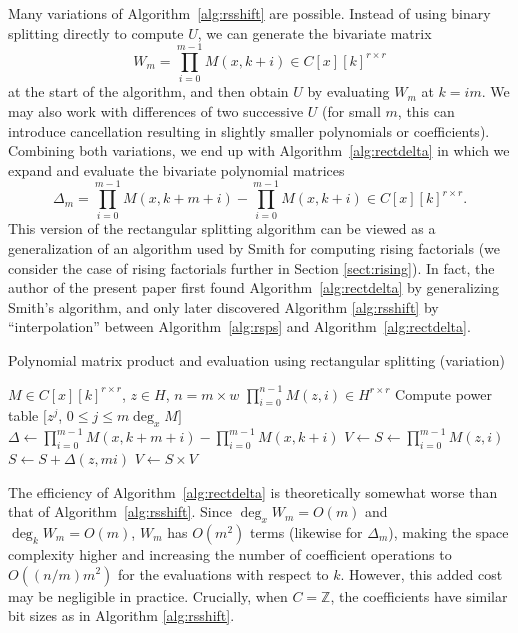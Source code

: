 \documentclass{sig-alternate}
\begin{document}
Many variations of Algorithm~\ref{alg:rsshift}
are possible. Instead of using binary
splitting directly to compute $U$, we can generate the bivariate matrix
\begin{equation}
W_m = \prod_{i=0}^{m-1} M(x,k+i) \in C[x][k]^{r \times r}
\end{equation}
at the start of the algorithm, and then
obtain $U$ by evaluating $W_m$ at $k = im$.
We may also work with differences of two successive $U$
(for small $m$, this can introduce cancellation
resulting in slightly smaller polynomials or coefficients).
Combining both variations, we end up with Algorithm~\ref{alg:rectdelta}
in which we expand and evaluate the bivariate polynomial matrices
\begin{equation*}
\Delta_m = \prod_{i=0}^{m-1} M(x,k+m+i) - \prod_{i=0}^{m-1} M(x,k+i) \in C[x][k]^{r \times r}.
\end{equation*}
This version of the rectangular splitting algorithm can be viewed as a generalization of an
algorithm used by Smith \cite{Smith2001} for computing rising factorials (we consider
the case of rising factorials further in Section \ref{sect:rising}).
In fact, the author of the present paper first
found Algorithm~\ref{alg:rectdelta} by generalizing
Smith's algorithm, and only later discovered
Algorithm \ref{alg:rsshift} by ``interpolation'' between
Algorithm~\ref{alg:rsps} and Algorithm~\ref{alg:rectdelta}.

\begin{algorithm}
  \caption{Polynomial matrix product and evaluation using rectangular splitting (variation)}
  \label{alg:rectdelta}
  \begin{algorithmic}[1]
    \Require $M \in C[x][k]^{r \times r}$, $z \in H$, $n = m \times w$
    \Ensure $\prod_{i=0}^{n-1} M(z,i) \in H^{r \times r}$
    \State Compute power table $[z^j$, $0 \le j \le m \deg_x M]$
    \State $\Delta \gets \prod_{i=0}^{m-1} M(x,k+m+i) - \prod_{i=0}^{m-1} M(x,k+i)$
    \Statex {}
    \State $V \gets S \gets \prod_{i=0}^{m-1} M(z,i)$
    \Statex {}
      \State $S \gets S + \Delta(z,mi)$
      \Statex {}
      \State $V \gets S \times V$
    \EndFor
    \State {}
  \end{algorithmic}
\end{algorithm}

The efficiency of Algorithm~\ref{alg:rectdelta} is theoretically
somewhat worse than that of Algorithm~\ref{alg:rsshift}.
Since $\deg_x W_m = O(m)$ and $\deg_k W_m = O(m)$,
$W_m$ has $O(m^2)$ terms (likewise for $\Delta_m$),
making the space complexity higher and increasing
the number of coefficient operations to $O((n/m) m^2)$
for the evaluations with respect to $k$.
However, this added cost may be negligible in practice.
Crucially, when $C = \mathbb{Z}$, the coefficients
have similar bit sizes as in Algorithm \ref{alg:rsshift}.
\end{document}
